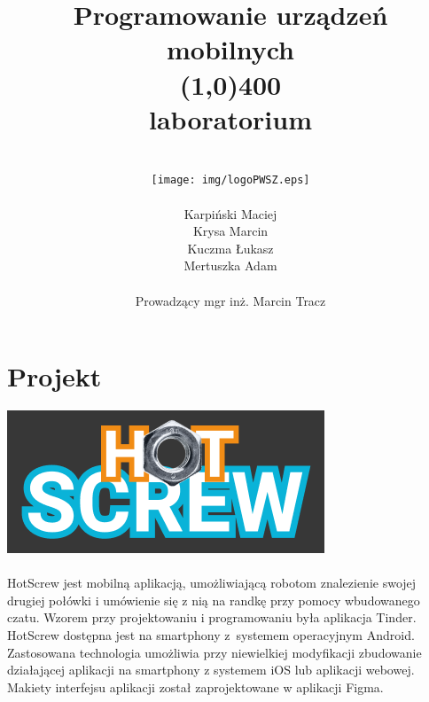 \documentclass[12pt,a4paper]{article}
\author{
	\\\texttt{[image: img/logoPWSZ.eps]} \\\\
	\hfill Karpiński Maciej\\
	\hfill Krysa Marcin\\
	\hfill Kuczma Łukasz\\
	\hfill Mertuszka Adam\\\\	
	\hfill Prowadzący mgr inż. Marcin Tracz
	}
\title{\textbf{Programowanie urządzeń mobilnych}\\\line(1,0){400}\\\textbf{laboratorium}}
\date{}
\begin{document}
	\maketitle
	\thispagestyle{fancy}
	\fancyhf{}
	\rhead{\textcolor{gray}{\footnotesize Państwowa Wyższa Szkoła Zawodowa im. Witelona w Legnicy\\Informatyka, rok IV\\Semestr zimowy 2021/2022}}	
	\renewcommand{\headrulewidth}{0pt}
	\clearpage

	\pagestyle{fancy}
	\rfoot{\thepage}	
	\tableofcontents
	\newpage

	\section{Projekt}	
	\includegraphics[]{img/logo.png}
	\\\\
	\indent HotScrew jest mobilną aplikacją, umożliwiającą robotom znalezienie swojej drugiej połówki i umówienie się z nią na randkę przy pomocy wbudowanego czatu.
	Wzorem przy projektowaniu i programowaniu była aplikacja Tinder.
	HotScrew dostępna jest na smartphony z~systemem operacyjnym Android. Zastosowana technologia umożliwia przy niewielkiej modyfikacji zbudowanie działającej
	aplikacji na smartphony z systemem iOS lub aplikacji webowej.\\
	\indent Makiety interfejsu aplikacji został zaprojektowane w aplikacji Figma.
\end{document}
